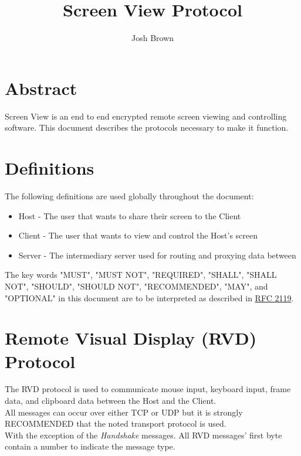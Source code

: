 \documentclass{article}
\title{Screen View Protocol}
\author{Josh Brown}
\newcommand{\projectName}{Screen View}
\begin{document}
    \maketitle
    \newpage


    \section{Abstract}
    \projectName{} is an end to end encrypted remote screen viewing and controlling software. This document describes
    the protocols necessary to make it function.
    \newpage


    \tableofcontents
    \newpage


    \section{Definitions}
    The following definitions are used globally throughout the document:

    \begin{itemize}
        \item Host - The user that wants to share their screen to the Client
        \item Client - The user that wants to view and control the Host's screen
        \item Server - The intermediary server used for routing and proxying data between
    \end{itemize}


    The key words "MUST", "MUST NOT", "REQUIRED", "SHALL", "SHALL NOT",
    "SHOULD", "SHOULD NOT", "RECOMMENDED", "MAY", and "OPTIONAL" in this
    document are to be interpreted as described in \href{https://datatracker.ietf.org/doc/html/rfc2119}{RFC 2119}.

    \newpage


    \section{Remote Visual Display (RVD) Protocol}

    The RVD protocol is used to communicate mouse input, keyboard input, frame data, and clipboard data between the Host and the Client.\\

    All messages can occur over either TCP or UDP but it is strongly RECOMMENDED that the noted transport protocol is used.\\

    With the exception of the \emph{Handshake} messages. All RVD messages' first byte contain a number to indicate the message type.
\end{document}

